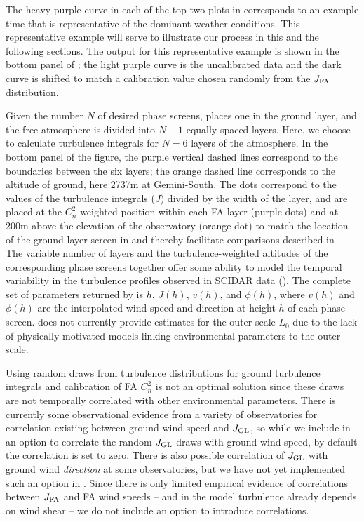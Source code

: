 \documentclass[twocolumn]{aastex631}
\begin{document}
The heavy purple curve in each of the top two plots in  corresponds to an example time that is representative of the dominant weather conditions. 
This representative example will serve to illustrate our process in this and the following sections.
The \osborn output for this representative example is shown in the bottom panel of ; the light purple curve is the uncalibrated data and the dark curve is shifted to match a calibration value chosen randomly from the $J_{\rm FA}$ distribution.

Given the number $N$ of desired phase screens, \psfws places one in the ground layer, and the free atmosphere is divided into $N-1$ equally spaced layers.
Here, we choose to calculate turbulence integrals for $N=6$ layers of the atmosphere.
In the bottom panel of the figure, the purple vertical dashed lines correspond to the boundaries between the six layers; the orange dashed line corresponds to the altitude of ground, here 2737\unit{m} at Gemini-South.
The dots correspond to the values of the turbulence integrals ($J$) divided by the width of the layer, and are placed at the $C_n^2$-weighted position within each FA layer (purple dots) and at 200\unit{m} above the elevation of the observatory (orange dot) to match the location of the ground-layer screen in \dcii and thereby facilitate comparisons described in .
The variable number of layers and the turbulence-weighted altitudes of the corresponding phase screens together offer some ability to model the temporal variability in the turbulence profiles observed in SCIDAR data (\osborn).
The complete set of parameters returned by \psfws is $h$, $J(h)$, $v(h)$, and $\phi(h)$, where $v(h)$ and $\phi(h)$ are the interpolated wind speed and direction at height $h$ of each  phase screen.
\psfws does not currently provide estimates for the outer scale $L_0$ due to the lack of physically motivated models linking environmental parameters to the outer scale.

Using random draws from turbulence distributions for ground turbulence integrals and calibration of FA $C_n^2$ is not an optimal solution since these draws are not temporally correlated with other environmental parameters. 
There is currently some observational evidence from a variety of observatories \citep{tokovinin_statistics_2003, tokovinin_optical_2005, chun_mauna_2009} for correlation existing between ground wind speed and $J_{\rm GL}$, so while we include in \psfws an option to correlate the random $J_{\rm GL}$ draws with ground wind speed, by default the correlation is set to zero.
There is also possible correlation of $J_{\rm GL}$ with ground wind \textit{direction} \citep{tokovinin_statistics_2003} at some observatories, but we have not yet implemented such an option in \psfws. 
Since there is only limited empirical evidence of correlations between $J_{\rm FA}$ and FA wind speeds \citep{tokovinin_statistics_2003} -- and in the \osborn model turbulence already depends on wind shear -- we do not include an option to introduce correlations. 
\end{document}
